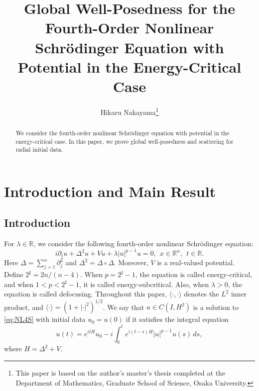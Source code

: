 \documentclass[11pt,a4paper]{article}
\numberwithin{equation}{section}
\begin{document}
\title{Global Well-Posedness for the Fourth-Order Nonlinear Schr\"{o}dinger Equation with Potential in the Energy-Critical Case}
\author{Hikaru Nakayama\thanks{This paper is based on the author's master's thesis completed at the Department of Mathematics, Graduate School of Science, Osaka University.}}
\date{}
\maketitle

\begin{abstract}
We consider the fourth-order nonlinear Schr\"{o}dinger equation with potential in the energy-critical case.
In this paper, we prove global well-posedness and scattering for radial initial data.
\end{abstract}

\tableofcontents

\newpage

\section{Introduction and Main Result}

\subsection{Introduction}

For $\lambda \in \mathbb{R}$, we consider the following fourth-order nonlinear Schr\"{o}dinger equation:
\begin{equation}\label{eq:NL4S}
  i\partial_{t}u + \Delta^{2}u + Vu + \lambda|u|^{p-1}u = 0,\ \ x \in \mathbb{R}^{n}, \ \ t \in \mathbb{R}.
\end{equation}
Here $\Delta = \sum_{j = 1}^{n} \partial_{j}^{2}$ and $\Delta^{2} = \Delta \circ \Delta$. Moreover, $V$ is a real-valued potential. Define $2^{\sharp} = 2n/(n-4)$. When $p = 2^{\sharp} - 1$, the equation is called energy-critical, and when $1 < p < 2^{\sharp}-1$, it is called energy-subcritical. Also, when $\lambda > 0$, the equation is called defocusing. Throughout this paper, $\langle \cdot, \cdot \rangle$ denotes the $L^{2}$ inner product, and $\langle  \cdot \rangle = (1 + |\cdot|^{2})^{1/2}$. We say that $u \in C(I, H^{2})$ is a solution to \eqref{eq:NL4S} with initial data $u_{0} = u(0)$ if it satisfies the integral equation
\[
 u(t) = e^{itH}u_{0} - i\int_{0}^{t}e^{i(t-s)H}|u|^{p-1}u(s)\, ds,
\]
where $H = \Delta^{2} + V$.
\end{document}
